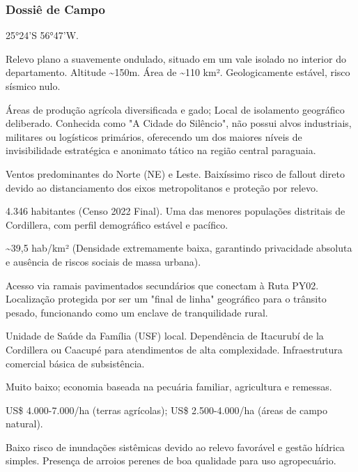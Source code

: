 \subsubsection{Dossiê de Campo}
\begin{description}[style=nextline,leftmargin=0.5cm,font=\bfseries]
\item[Coordenadas]  25°24'S 56°47'W.
\item[Topografia]  Relevo plano a suavemente ondulado, situado em um vale isolado no interior do departamento. Altitude \textasciitilde 150m. Área de \textasciitilde 110 km². Geologicamente estável, risco sísmico nulo.
\item[Alvos Estratégicos]  Áreas de produção agrícola diversificada e gado; Local de isolamento geográfico deliberado. Conhecida como "A Cidade do Silêncio", não possui alvos industriais, militares ou logísticos primários, oferecendo um dos maiores níveis de invisibilidade estratégica e anonimato tático na região central paraguaia.
\item[Fallout]  Ventos predominantes do Norte (NE) e Leste. Baixíssimo risco de fallout direto devido ao distanciamento dos eixos metropolitanos e proteção por relevo.
\item[População]  4.346 habitantes (Censo 2022 Final). Uma das menores populações distritais de Cordillera, com perfil demográfico estável e pacífico.
\item[Densidade]  \textasciitilde 39,5 hab/\allowbreak km² (Densidade extremamente baixa, garantindo privacidade absoluta e ausência de riscos sociais de massa urbana).
\item[Vias de Acesso]  Acesso via ramais pavimentados secundários que conectam à Ruta PY02. Localização protegida por ser um "final de linha" geográfico para o trânsito pesado, funcionando como um enclave de tranquilidade rural.
\item[Serviços]  Unidade de Saúde da Família (USF) local. Dependência de Itacurubí de la Cordillera ou Caacupé para atendimentos de alta complexidade. Infraestrutura comercial básica de subsistência.
\item[Custo de Vida]  Muito baixo; economia baseada na pecuária familiar, agricultura e remessas.
\item[Preço da Terra]  US\$ 4.000-7.000/\allowbreak ha (terras agrícolas); US\$ 2.500-4.000/\allowbreak ha (áreas de campo natural).
\item[Hidrologia]  Baixo risco de inundações sistêmicas devido ao relevo favorável e gestão hídrica simples. Presença de arroios perenes de boa qualidade para uso agropecuário.

\end{description}
